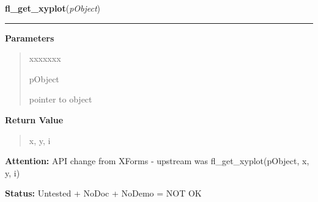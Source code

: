 \hspace{.8\funcindent}\begin{boxedminipage}{\funcwidth}

    \raggedright \textbf{fl\_get\_xyplot}(\textit{pObject})

    \vspace{-1.5ex}

    \rule{\textwidth}{0.5\fboxrule}
\setlength{\parskip}{2ex}
\setlength{\parskip}{1ex}
      \textbf{Parameters}
      \vspace{-1ex}

      \begin{quote}
        \begin{Ventry}{xxxxxxx}

          \item[pObject]

          pointer to object

        \end{Ventry}

      \end{quote}

      \textbf{Return Value}
    \vspace{-1ex}

      \begin{quote}
      x, y, i

      \end{quote}

\textbf{Attention:} API change from XForms - upstream was fl\_get\_xyplot(pObject, x, y, i)



\textbf{Status:} Untested + NoDoc + NoDemo = NOT OK



    \end{boxedminipage}

    \label{xformslib:library:fl_get_xyplot_data}

    \vspace{0.5ex}

